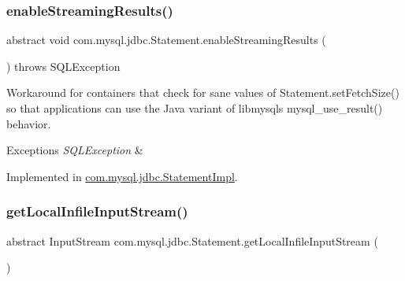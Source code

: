 \mbox{\label{interfacecom_1_1mysql_1_1jdbc_1_1_statement_aa90a0a4175d666982052d7bccacc272e}} 
\subsubsection{\texorpdfstring{enable\+Streaming\+Results()}{enableStreamingResults()}}
{\footnotesize\ttfamily abstract void com.\+mysql.\+jdbc.\+Statement.\+enable\+Streaming\+Results (\begin{DoxyParamCaption}{ }\end{DoxyParamCaption}) throws S\+Q\+L\+Exception\hspace{0.3cm}{\ttfamily [abstract]}}

Workaround for containers that \textquotesingle{}check\textquotesingle{} for sane values of Statement.\+set\+Fetch\+Size() so that applications can use the Java variant of libmysql\textquotesingle{}s mysql\+\_\+use\+\_\+result() behavior.


\begin{DoxyExceptions}{Exceptions}
{\em S\+Q\+L\+Exception} & \\
\hline
\end{DoxyExceptions}


Implemented in \mbox{\hyperlink{classcom_1_1mysql_1_1jdbc_1_1_statement_impl_aebd63b45b20e164efe403d4c1d5bebc9}{com.\+mysql.\+jdbc.\+Statement\+Impl}}.

\mbox{\label{interfacecom_1_1mysql_1_1jdbc_1_1_statement_a8d6f52df95db141768cab717ef315038}} 
\subsubsection{\texorpdfstring{get\+Local\+Infile\+Input\+Stream()}{getLocalInfileInputStream()}}
{\footnotesize\ttfamily abstract Input\+Stream com.\+mysql.\+jdbc.\+Statement.\+get\+Local\+Infile\+Input\+Stream (\begin{DoxyParamCaption}{ }\end{DoxyParamCaption})\hspace{0.3cm}{\ttfamily [abstract]}}

